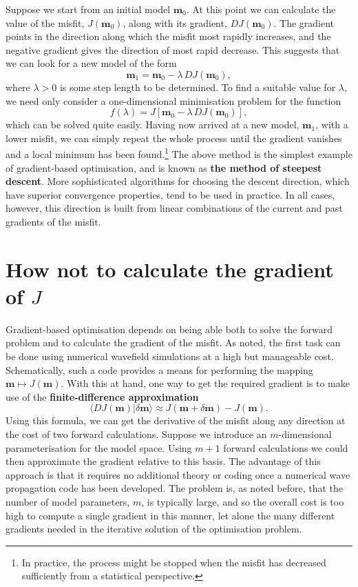 Suppose we start from an initial model $\mathbf{m}_{0}$. At this point we can calculate the value of the misfit,
 $J(\mathbf{m}_{0})$, along with its gradient, $DJ(\mathbf{m}_{0})$. The gradient points in the direction along which 
 the misfit most rapidly increases, and the negative gradient gives the direction of most rapid decrease. This suggests
  that we can look for a new model of the form
\begin{equation}
\mathbf{m}_{1}=\mathbf{m}_{0}-\lambda\,DJ(\mathbf{m}_{0}),
\label{eq:6}
\end{equation}
where $\lambda>0$ is some step length to be determined. To find a suitable value for $\lambda$, we need only consider 
a one-dimensional minimisation problem for the function
\begin{equation}
f(\lambda)=J[\mathbf{m}_{0}-\lambda\,DJ(\mathbf{m}_{0})],
\label{eq:7}
\end{equation}
which can be solved quite easily. Having now arrived at a new model, $\mathbf{m}_{1}$, with a lower 
misfit, we can simply repeat the whole process until the gradient vanishes and a local minimum has been 
found.\footnote{In practice, the process might be stopped when the misfit has decreased sufficiently from a
 statistical perspective.} The above method is the simplest example of gradient-based optimisation, and is known as
\textbf{the method of steepest descent}. More sophisticated algorithms for choosing the descent direction, 
which have superior convergence properties, tend to be used in practice. In all cases, however, this direction 
is built from linear combinations of the current and past gradients of the misfit.

\section*{How not to calculate the gradient of $J$}
Gradient-based optimisation depends on being able both to solve the forward problem and to 
calculate the gradient of the misfit. As noted, the first task can be done using numerical wavefield simulations 
at a high but manageable cost. Schematically, such a code provides a means for performing the 
mapping $\mathbf{m}\mapsto J(\mathbf{m})$. With this at hand, one way to get the required gradient is to make use of 
the \textbf{finite-difference approximation}
\begin{equation}
\langle DJ(\mathbf{m})|\delta \mathbf{m}\rangle\approx J(\mathbf{m}+\delta \mathbf{m})-J(\mathbf{m}).
\label{eq:8}
\end{equation}
Using this formula, we can get the derivative of the misfit along any direction at the cost of two forward calculations.
Suppose we introduce an $m$-dimensional
parameterisation for the model space. Using $m+1$ forward calculations we could then approximate the gradient relative to this
basis. The advantage of this approach is that it requires no additional theory or coding once a numerical wave propagation 
code has been developed. The problem is, as noted before, that the number of model parameters, $m$, is typically large, and so the
overall cost is too high to compute a single gradient in this manner, let alone the many different gradients needed in the 
iterative solution of the optimisation problem.

